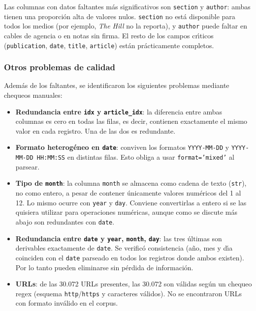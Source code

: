 \documentclass[11pt,a4paper]{article}
\begin{document}
Las columnas con datos faltantes m\'{a}s significativos son \texttt{section} y \texttt{author}: ambas tienen una proporci\'{o}n alta de valores nulos. \texttt{section} no est\'{a} disponible para todos los medios (por ejemplo, \textit{The Hill} no la reporta), y \texttt{author} puede faltar en cables de agencia o en notas sin firma. El resto de los campos cr\'{\i}ticos (\texttt{publication}, \texttt{date}, \texttt{title}, \texttt{article}) est\'{a}n pr\'{a}cticamente completos.

\subsubsection*{Otros problemas de calidad}

Adem\'{a}s de los faltantes, se identificaron los siguientes problemas mediante chequeos manuales:

\begin{itemize}
    \item \textbf{Redundancia entre \texttt{idx} y \texttt{article\_idx}}: la diferencia entre ambas columnas es cero en todas las filas, es decir, contienen exactamente el mismo valor en cada registro. Una de las dos es redundante.
    \item \textbf{Formato heterog\'{e}neo en \texttt{date}}: conviven los formatos \texttt{YYYY-MM-DD} y \texttt{YYYY-MM-DD HH:MM:SS} en distintas filas. Esto obliga a usar \texttt{format='mixed'} al parsear.
    \item \textbf{Tipo de \texttt{month}}: la columna \texttt{month} se almacena como cadena de texto (\texttt{str}), no como entero, a pesar de contener \'{u}nicamente valores num\'{e}ricos del 1 al 12. Lo mismo ocurre con \texttt{year} y \texttt{day}. Conviene convertirlas a entero si se las quisiera utilizar para operaciones num\'{e}ricas, aunque como se discute m\'{a}s abajo son redundantes con \texttt{date}.
    \item \textbf{Redundancia entre \texttt{date} y \texttt{year}, \texttt{month}, \texttt{day}}: las tres \'{u}ltimas son derivables exactamente de \texttt{date}. Se verific\'{o} consistencia (a\~{n}o, mes y d\'{\i}a coinciden con el \texttt{date} parseado en todos los registros donde ambos existen). Por lo tanto pueden eliminarse sin p\'{e}rdida de informaci\'{o}n.
    \item \textbf{URLs}: de las 30.072 URLs presentes, las 30.072 son v\'alidas seg\'un un chequeo regex (esquema \texttt{http}/\texttt{https} y caracteres v\'alidos). No se encontraron URLs con formato inv\'{a}lido en el corpus.
\end{itemize}
\end{document}
